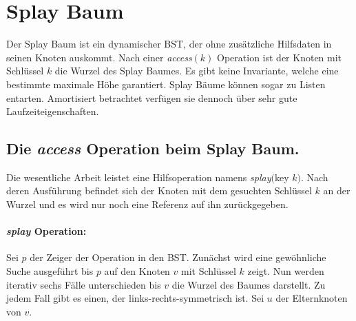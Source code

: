 \documentclass[a4paper,12pt]{article}
\begin{document}
\section{Splay Baum}
Der  Splay Baum \cite{splay} ist ein dynamischer BST, der ohne zusätzliche Hilfsdaten in seinen Knoten auskommt. Nach einer \textit{access}$\left(k\right)$ Operation ist der Knoten mit Schlüssel $k$ die Wurzel des Splay Baumes. Es gibt keine Invariante, welche eine bestimmte maximale Höhe garantiert. Splay Bäume können sogar zu Listen entarten. Amortisiert betrachtet verfügen sie dennoch über sehr gute Laufzeiteigenschaften. 


\subsection{Die \textit{access} Operation beim Splay Baum. }
Die wesentliche Arbeit leistet eine Hilfsoperation namens \textit{splay}$($key $k)$. Nach deren Ausführung befindet sich der Knoten mit dem gesuchten Schlüssel $k$ an der Wurzel und es wird nur noch eine Referenz auf ihn zurückgegeben.

\paragraph{\textit{splay} Operation:}
Sei $p$ der Zeiger der Operation in den BST. Zunächst wird eine gewöhnliche Suche ausgeführt bis $p$ auf den Knoten $v$ mit Schlüssel $k$ zeigt. Nun werden iterativ sechs Fälle unterschieden bis $v$ die Wurzel des Baumes darstellt. Zu jedem Fall gibt es einen, der links-rechts-symmetrisch ist. Sei $u$ der Elternknoten von $v$. 
\end{document}
